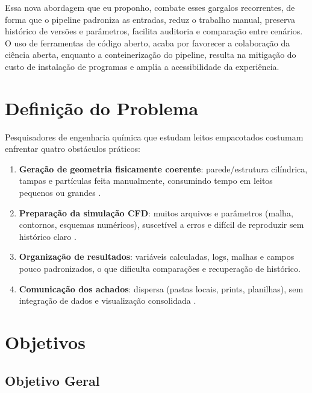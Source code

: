 Essa nova abordagem que eu proponho, combate esses gargalos recorrentes, de forma que o pipeline padroniza as entradas, reduz o trabalho manual, preserva histórico de versões e parâmetros, facilita auditoria e comparação entre cenários. O uso de ferramentas de código aberto, acaba por favorecer a colaboração da ciência aberta, enquanto a conteinerização do pipeline, resulta na mitigação do custo de instalação de programas e amplia a acessibilidade da experiência.

\section{Definição do Problema}

Pesquisadores de engenharia química que estudam leitos empacotados costumam enfrentar quatro obstáculos práticos:

\begin{enumerate}
    \item \textbf{Geração de geometria fisicamente coerente}: parede/estrutura cilíndrica, tampas e partículas feita manualmente, consumindo tempo em leitos pequenos ou grandes \cite{blender2021}.
    
    \item \textbf{Preparação da simulação CFD}: muitos arquivos e parâmetros (malha, contornos, esquemas numéricos), suscetível a erros e difícil de reproduzir sem histórico claro \cite{openfoam2023}.
    
    \item \textbf{Organização de resultados}: variáveis calculadas, logs, malhas e campos pouco padronizados, o que dificulta comparações e recuperação de histórico.
    
    \item \textbf{Comunicação dos achados}: dispersa (pastas locais, prints, planilhas), sem integração de dados e visualização consolidada \cite{fastapi2021}.
\end{enumerate}

\section{Objetivos}

\subsection{Objetivo Geral}

